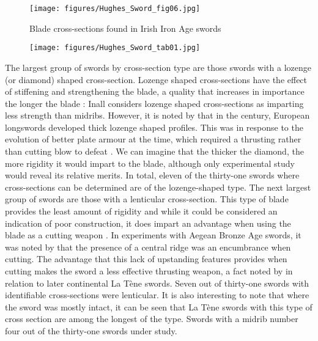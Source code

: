 \begin{wrapfigure}{O}{.5\textwidth}
\texttt{[image: figures/Hughes\_Sword\_fig06.jpg]} 
\caption{Blade cross-sections found in Irish Iron Age swords }
\label{hughes_fig6}
\end{wrapfigure}

\begin{figure}%
\texttt{[image: figures/Hughes\_Sword\_tab01.jpg]} 
\label{tab1}
\end{figure}

	

The largest group of swords by cross-section type are those swords with a lozenge (or diamond) shaped cross-section. 
Lozenge shaped cross-sections have the effect of stiffening and strengthening the blade, a quality that increases in importance the longer the blade \parencite[106]{Inall2009}:
Inall considers lozenge shaped cross-sections as imparting less strength than midribs. 
However, it is noted by \textcite{Oakeshott1960} that in the  century\AD, European longswords developed thick lozenge shaped profiles. 
This was in response to the evolution of better plate armour at the time, which required a thrusting rather than cutting blow to defeat \parencite[301]{Oakeshott1960}. 
We can imagine that the thicker the diamond, the more rigidity it would impart to the blade, although only experimental study would reveal its relative merits. 
In total, eleven of the thirty-one swords where cross-sections can be determined are of the lozenge-shaped type.
The next largest group of swords are those with a lenticular cross-section. 
This type of blade provides the least amount of rigidity and while it could be considered an indication of poor construction, 
it does impart an advantage when using the blade as a cutting weapon \parencite[106]{Inall2009}. 
In experiments with Aegean Bronze Age swords, it was noted by \textcite[124]{Molloy2008} that the presence of a central ridge was an encumbrance when cutting. 
The advantage that this lack of upstanding features provides when cutting makes the sword a less effective thrusting weapon, a fact noted by \textcite[54\psqq]{Oakeshott1960} in relation to later continental La Tène swords. 
Seven out of thirty-one swords with identifiable cross-sections were lenticular. It is also interesting to note that where the sword was mostly intact, it can be seen that La Tène swords with this type of cross section are among the longest of the type.
Swords with a midrib number four out of the thirty-one swords under study. 

